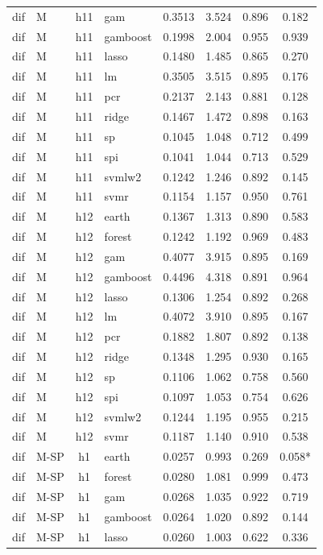 \begin{ThreePartTable}
\begin{longtable}[t]{llclcccc}
dif & M & h11 & gam & 0.3513 & 3.524 & 0.896 & 0.182\\
dif & M & h11 & gamboost & 0.1998 & 2.004 & 0.955 & 0.939\\
dif & M & h11 & lasso & 0.1480 & 1.485 & 0.865 & 0.270\\
dif & M & h11 & lm & 0.3505 & 3.515 & 0.895 & 0.176\\
dif & M & h11 & pcr & 0.2137 & 2.143 & 0.881 & 0.128\\
dif & M & h11 & ridge & 0.1467 & 1.472 & 0.898 & 0.163\\
dif & M & h11 & sp & 0.1045 & 1.048 & 0.712 & 0.499\\
dif & M & h11 & spi & 0.1041 & 1.044 & 0.713 & 0.529\\
dif & M & h11 & svmlw2 & 0.1242 & 1.246 & 0.892 & 0.145\\
dif & M & h11 & svmr & 0.1154 & 1.157 & 0.950 & 0.761\\
\addlinespace
dif & M & h12 & earth & 0.1367 & 1.313 & 0.890 & 0.583\\
dif & M & h12 & forest & 0.1242 & 1.192 & 0.969 & 0.483\\
dif & M & h12 & gam & 0.4077 & 3.915 & 0.895 & 0.169\\
dif & M & h12 & gamboost & 0.4496 & 4.318 & 0.891 & 0.964\\
dif & M & h12 & lasso & 0.1306 & 1.254 & 0.892 & 0.268\\
dif & M & h12 & lm & 0.4072 & 3.910 & 0.895 & 0.167\\
dif & M & h12 & pcr & 0.1882 & 1.807 & 0.892 & 0.138\\
dif & M & h12 & ridge & 0.1348 & 1.295 & 0.930 & 0.165\\
dif & M & h12 & sp & 0.1106 & 1.062 & 0.758 & 0.560\\
dif & M & h12 & spi & 0.1097 & 1.053 & 0.754 & 0.626\\
dif & M & h12 & svmlw2 & 0.1244 & 1.195 & 0.955 & 0.215\\
dif & M & h12 & svmr & 0.1187 & 1.140 & 0.910 & 0.538\\
\addlinespace
dif & M-SP & h1 & earth & 0.0257 & 0.993 & 0.269 & 0.058*\\
dif & M-SP & h1 & forest & 0.0280 & 1.081 & 0.999 & 0.473\\
dif & M-SP & h1 & gam & 0.0268 & 1.035 & 0.922 & 0.719\\
dif & M-SP & h1 & gamboost & 0.0264 & 1.020 & 0.892 & 0.144\\
dif & M-SP & h1 & lasso & 0.0260 & 1.003 & 0.622 & 0.336\\

\end{longtable}
\end{ThreePartTable}
